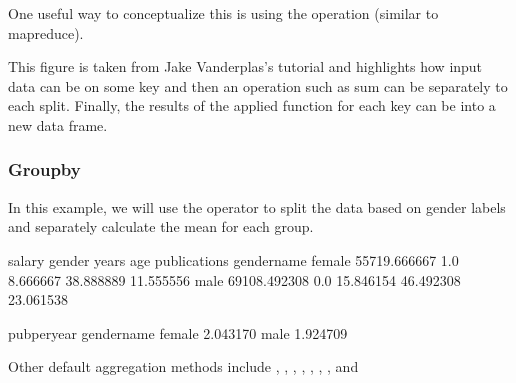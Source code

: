 \documentclass[letterpaper,10pt,english]{sphinxmanual}
\begin{document}
One useful way to conceptualize this is using the  operation (similar to map\sphinxhyphen{}reduce).


This figure is taken from Jake Vanderplas’s tutorial and highlights how input data can be  on some key and then an operation such as sum can be  separately to each split. Finally, the results of the applied function for each key can be  into a new data frame.


\subsubsection{Groupby}
\label{\detokenize{content/Introduction_to_Pandas:groupby}}
In this example, we will use the  operator to split the data based on gender labels and separately calculate the mean for each group.

\begin{sphinxVerbatim}[commandchars=\\\{\}]
\end{sphinxVerbatim}

\begin{sphinxVerbatim}[commandchars=\\\{\}]
                   salary  gender      years        age  publications  \PYGZbs{}
gender\PYGZus{}name                                                             
female       55719.666667     1.0   8.666667  38.888889     11.555556   
male         69108.492308     0.0  15.846154  46.492308     23.061538   

             pub\PYGZus{}per\PYGZus{}year  
gender\PYGZus{}name                
female           2.043170  
male             1.924709  
\end{sphinxVerbatim}

Other default aggregation methods include , , , , , , , and 
\end{document}
